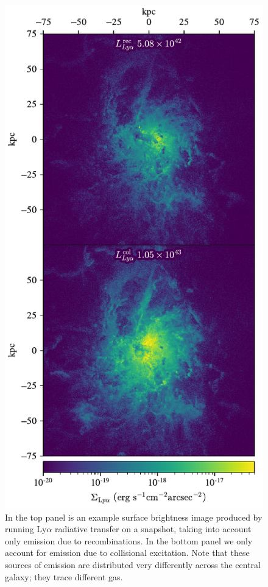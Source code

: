 \begin{figure}
    \centering
    \includegraphics[width=\textwidth,height=0.9\textheight,keepaspectratio]{figures/sb_rec_vs_col.pdf}
    \caption{
        In the top panel is an example surface brightness image produced by running Ly$\alpha$ radiative transfer on a snapshot, taking into account only emission due to recombinations.
        In the bottom panel we only account for emission due to collisional excitation.
        Note that these sources of emission are distributed very differently across the central galaxy; they trace different gas.
    }
    \label{fig:121_rec_col}
\end{figure}


